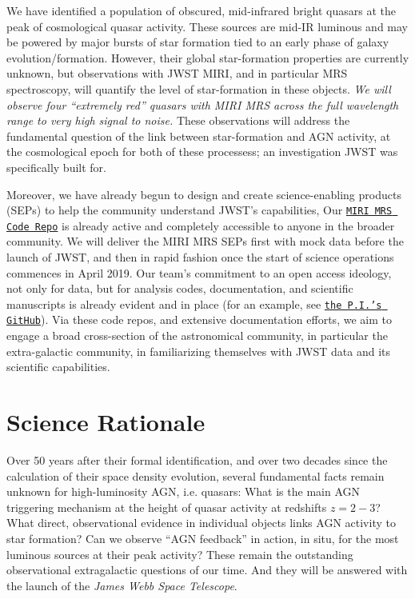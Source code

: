 We have identified a population of obscured, mid-infrared bright
quasars at the peak of cosmological quasar activity.  These sources are
mid-IR luminous and may be powered by major bursts of star formation
tied to an early phase of galaxy evolution/formation. However, their
global star-formation properties are currently unknown, but
observations with JWST MIRI, and in particular MRS spectroscopy, will
quantify the level of star-formation in these objects.  {\it We will
observe four ``extremely red'' quasars with MIRI MRS across the full wavelength range to
very high signal to noise.} These observations will address the
fundamental question of the link between star-formation and AGN
activity, at the cosmological epoch for both of these processess; an
investigation JWST was specifically built for.

\smallskip \smallskip
\noindent
Moreover, we have already begun to design and create science-enabling
products (SEPs) to help the community understand JWST's capabilities,
Our \href{https://github.com/miri-mrs}{{\tt MIRI MRS Code Repo}} is
already active and completely accessible to anyone in the broader
community.  We will deliver the MIRI MRS SEPs first with mock data
before the launch of JWST, and then in rapid fashion once the start of
science operations commences in April 2019.
Our team's commitment to an open access ideology, not only for data,
but for analysis codes, documentation, and scientific manuscripts is
already evident and in place (for an example, see
\href{https://github.com/d80b2t}{{\tt the P.I.'s GitHub}}).  Via these
code repos, and extensive documentation efforts, we aim to engage a
broad cross-section of the astronomical community, in particular the
extra-galactic community, in familiarizing themselves with JWST data
and its scientific capabilities.


\section*{Science Rationale}
\vspace{-6pt}
\noindent
Over 50 years after their formal identification, and over two decades
since the calculation of their space density evolution, several
fundamental facts remain unknown for high-luminosity AGN,
i.e. quasars: What is the main AGN triggering mechanism at the height
of quasar activity at redshifts $z=2-3$? What direct,
observational evidence in individual objects links AGN activity
to star formation?  Can we observe ``AGN feedback'' in action, in situ,  
for the most luminous sources at their peak activity? These remain the
outstanding observational extragalactic questions of our time. And
they will be answered with the launch of the {\it James Webb Space
Telescope}.

